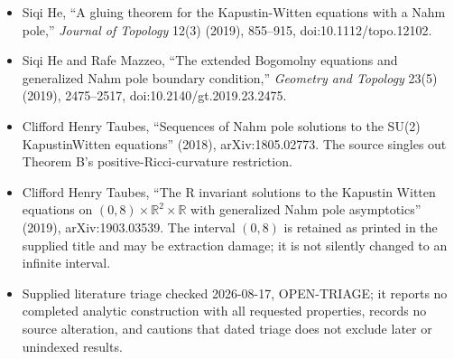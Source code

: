 \documentclass[11pt]{article}
\newcommand{\R}{\mathbb{R}}
\begin{document}
\begin{itemize}
\item [He19] Siqi He, ``A gluing theorem for the Kapustin-Witten equations with a Nahm pole,'' \emph{Journal of Topology} 12(3) (2019), 855--915, doi:10.1112/topo.12102.
\item [HM19a] Siqi He and Rafe Mazzeo, ``The extended Bogomolny equations and generalized Nahm pole boundary condition,'' \emph{Geometry and Topology} 23(5) (2019), 2475--2517, doi:10.2140/gt.2019.23.2475.
\item [Tau18] Clifford Henry Taubes, ``Sequences of Nahm pole solutions to the SU(2) KapustinWitten equations'' (2018), arXiv:1805.02773. The source singles out Theorem B's positive-Ricci-curvature restriction.
\item [Tau19] Clifford Henry Taubes, ``The R invariant solutions to the Kapustin Witten equations on $(0,8)\times\R^2\times\R$ with generalized Nahm pole asymptotics'' (2019), arXiv:1903.03539. The interval $(0,8)$ is retained as printed in the supplied title and may be extraction damage; it is not silently changed to an infinite interval.
\item Supplied literature triage checked 2026-08-17, OPEN-TRIAGE; it reports no completed analytic construction with all requested properties, records no source alteration, and cautions that dated triage does not exclude later or unindexed results.
\end{itemize}
\end{document}
